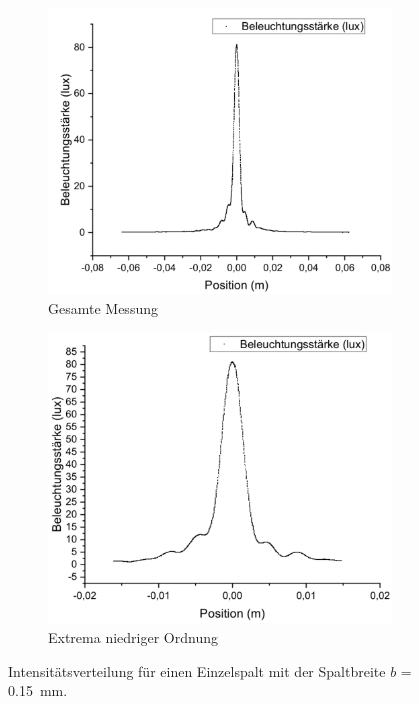 \documentclass[
	a4paper,
	12pt,
	pagesize,
	ngerman
]{scrartcl}
\begin{document}
	\begin{figure}[H]
		\centering
		\begin{subfigure}{.5\textwidth}
			\centering
			\includegraphics[width=1\linewidth]{Einzelspalt0-150mm}
			\caption{Gesamte Messung}	
		\end{subfigure}%
		\begin{subfigure}{.5\textwidth}
			\centering
			\includegraphics[width=1\linewidth]{Einzelspalt0-150mmZOOM}
			\caption{Extrema niedriger Ordnung}
		\end{subfigure}
		\caption{Intensitätsverteilung für einen Einzelspalt mit der Spaltbreite $b$ = \SI{0,15}{mm}.}
		\label{Einzelspalt0-150mm}
	\end{figure}	
\end{document}
